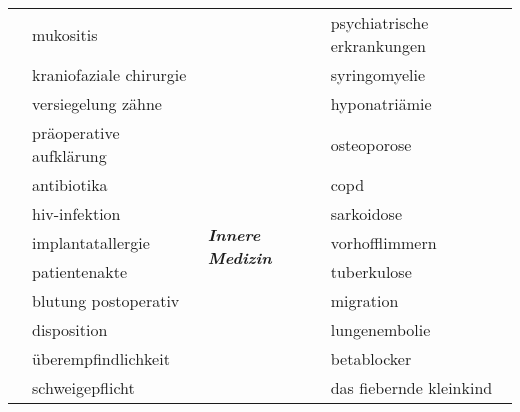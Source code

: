 \begin{table}[H]
{\begin{tabular}{ll|ll}
                                                & mukositis                                     &                                                               & psychiatrische erkrankungen  \\
                                                & kraniofaziale chirurgie                       &                                                               & syringomyelie                \\ \cline{3-4} 
                                                & versiegelung zähne                            & \multirow{10}{*}{\textit{\textbf{Innere Medizin}}}            & hyponatriämie                \\
                                                & präoperative aufklärung                       &                                                               & osteoporose                  \\
                                                & antibiotika                                   &                                                               & copd                         \\
                                                & hiv-infektion                                 &                                                               & sarkoidose                   \\
                                                & implantatallergie                             &                                                               & vorhofflimmern               \\
                                                & patientenakte                                 &                                                               & tuberkulose                  \\
                                                & blutung postoperativ                          &                                                               & migration                    \\
                                                & disposition                                   &                                                               & lungenembolie                \\
                                                & überempfindlichkeit                           &                                                               & betablocker                  \\
                                                & schweigepflicht                               &                                                               & das fiebernde kleinkind      \\ \hline

\end{tabular}}
\end{table}
